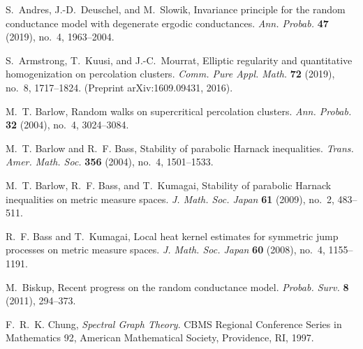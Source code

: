 \documentclass{article}
\numberwithin{equation}{section}
\theoremstyle{definition}
\theoremstyle{remark}
\begin{document}
   



\begin{thebibliography}{99}

S.~Andres, J.-D.~Deuschel, and M.~Slowik, Invariance principle for the random conductance model with degenerate ergodic conductances.
\emph{Ann. Probab.} \textbf{47} (2019), no.~4, 1963--2004.

S.~Armstrong, T.~Kuusi, and J.-C.~Mourrat, Elliptic regularity and quantitative homogenization on percolation clusters.
\emph{Comm. Pure Appl. Math.} \textbf{72} (2019), no.~8, 1717--1824. (Preprint arXiv:1609.09431, 2016).

M.~T. Barlow, Random walks on supercritical percolation clusters.
\emph{Ann. Probab.} \textbf{32} (2004), no.~4, 3024--3084.

M.~T. Barlow and R.~F. Bass, Stability of parabolic Harnack inequalities.
\emph{Trans. Amer. Math. Soc.} \textbf{356} (2004), no.~4, 1501--1533.

M.~T. Barlow, R.~F. Bass, and T.~Kumagai, Stability of parabolic Harnack inequalities on metric measure spaces.
\emph{J. Math. Soc. Japan} \textbf{61} (2009), no.~2, 483--511.

R.~F. Bass and T.~Kumagai, Local heat kernel estimates for symmetric jump processes on metric measure spaces.
\emph{J. Math. Soc. Japan} \textbf{60} (2008), no.~4, 1155--1191.

M.~Biskup, Recent progress on the random conductance model.
\emph{Probab. Surv.} \textbf{8} (2011), 294--373.

F.~R.~K. Chung, \emph{Spectral Graph Theory}.
CBMS Regional Conference Series in Mathematics 92, American Mathematical Society, Providence, RI, 1997.


\end{thebibliography}
\end{document}
